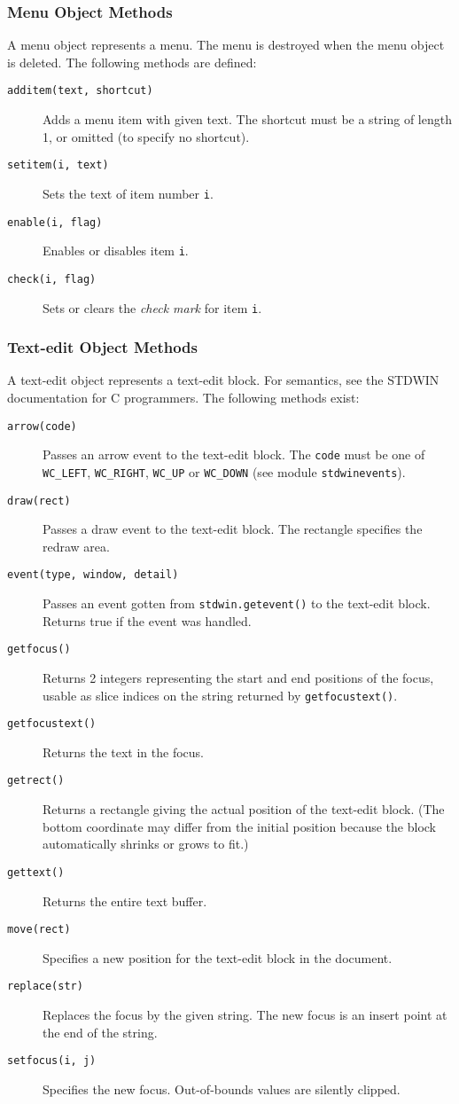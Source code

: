 \subsubsection{Menu Object Methods}

A menu object represents a menu.
The menu is destroyed when the menu object is deleted.
The following methods are defined:
\begin{description}
\item[{\tt additem(text, shortcut)}]
Adds a menu item with given text.
The shortcut must be a string of length 1, or omitted (to specify no
shortcut).
\item[{\tt setitem(i, text)}]
Sets the text of item number
{\tt i}.
\item[{\tt enable(i, flag)}]
Enables or disables item
{\tt i}.
\item[{\tt check(i, flag)}]
Sets or clears the
{\em check mark}
for item
{\tt i}.
\end{description}

\subsubsection{Text-edit Object Methods}

A text-edit object represents a text-edit block.
For semantics, see the STDWIN documentation for C programmers.
The following methods exist:
\begin{description}
\item[{\tt arrow(code)}]
Passes an arrow event to the text-edit block.
The
{\tt code}
must be one of
{\tt WC\_LEFT},
{\tt WC\_RIGHT},
{\tt WC\_UP}
or
{\tt WC\_DOWN}
(see module
{\tt stdwinevents}).
\item[{\tt draw(rect)}]
Passes a draw event to the text-edit block.
The rectangle specifies the redraw area.
\item[{\tt event(type, window, detail)}]
Passes an event gotten from
{\tt stdwin.getevent()}
to the text-edit block.
Returns true if the event was handled.
\item[{\tt getfocus()}]
Returns 2 integers representing the start and end positions of the
focus, usable as slice indices on the string returned by
{\tt getfocustext()}.
\item[{\tt getfocustext()}]
Returns the text in the focus.
\item[{\tt getrect()}]
Returns a rectangle giving the actual position of the text-edit block.
(The bottom coordinate may differ from the initial position because
the block automatically shrinks or grows to fit.)
\item[{\tt gettext()}]
Returns the entire text buffer.
\item[{\tt move(rect)}]
Specifies a new position for the text-edit block in the document.
\item[{\tt replace(str)}]
Replaces the focus by the given string.
The new focus is an insert point at the end of the string.
\item[{\tt setfocus(i,~j)}]
Specifies the new focus.
Out-of-bounds values are silently clipped.
\end{description}

